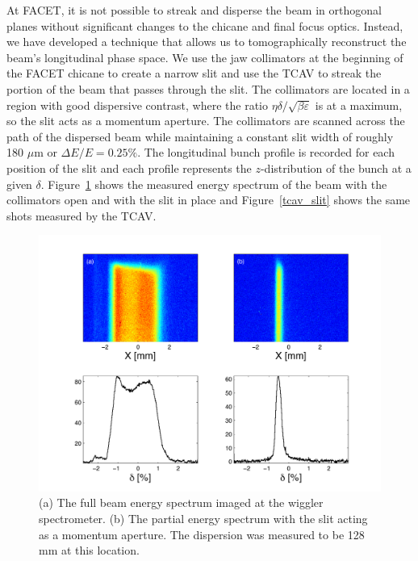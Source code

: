 \documentclass[%
twocolumn,
showpacs,preprintnumbers,
 aps,
prstab,
]{revtex4-1}
\begin{document}

At FACET, it is not possible to streak and disperse the beam in orthogonal planes without significant changes to the chicane and final focus optics. Instead, we have developed a technique that allows us to tomographically reconstruct the beam's longitudinal phase space.  We use the jaw collimators at the beginning of the FACET chicane to create a narrow slit and use the TCAV to streak the portion of the beam that passes through the slit. The collimators are located in a region with good dispersive contrast, where the ratio $\eta \delta / \sqrt{\beta \varepsilon}$ is at a maximum, so the slit acts as a momentum aperture. The collimators are scanned across the path of the dispersed beam while maintaining a constant slit width of roughly 180 $\mu$m or $\Delta E/E = 0.25\%$. The longitudinal bunch profile is recorded for each position of the slit and each profile represents the $z$-distribution of the bunch at a given $\delta$. Figure~\ref{slit} shows the measured energy spectrum of the beam with the collimators open and with the slit in place and Figure~\ref{tcav_slit} shows the same shots measured by the TCAV.

\begin{figure}[hbt]
  \includegraphics[width=\columnwidth]{figures/slit_wlabel.pdf}
  \caption{(a) The full beam energy spectrum imaged at the wiggler spectrometer. (b) The partial energy spectrum with the slit acting as a momentum aperture. The dispersion was measured to be 128 mm at this location.}
  \label{slit}
\end{figure}
\end{document}
